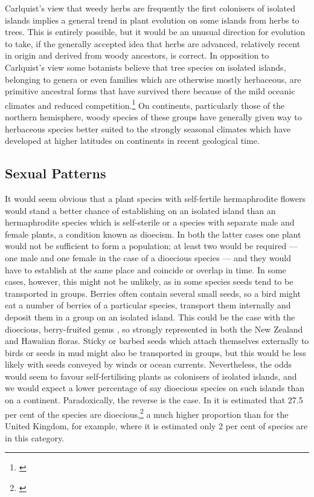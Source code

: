 Carlquist's view that weedy herbs are frequently the first colonisers of isolated islands implies a general trend in plant evolution on some islands from herbs to trees.
This is entirely possible, but it would be an unusual direction for evolution to take, if the generally accepted idea that herbs are advanced, relatively recent in origin and derived from woody ancestors, is correct.
In opposition to Carlquist's view some botanists believe that tree species on isolated islands, belonging to genera or even families which are otherwise mostly herbaceous, are primitive ancestral forms that have survived there because of the mild oceanic climates and reduced competition.\footnote{\cite{mabberley1979pachycaul}}
On continents, particularly those of the northern hemisphere, woody species of these groups have generally given way to herbaceous species better suited to the strongly seasonal climates which have developed at higher latitudes on continents in recent geological time.

\subsection{Sexual Patterns}

It would seem obvious that a plant species with self-fertile hermaphrodite flowers would stand a better chance of establishing on an isolated island than an hermaphrodite species which is self-sterile or a species with separate male and female plants, a condition known as dioecism.
In both the latter cases one plant would not be sufficient to form a population; at least two would be required --- one male and one female in the case of a dioecious species --- and they would have to establish at the same place and coincide or overlap in time.
In some cases, however, this might not be unlikely, as in some species seeds tend to be transported in groups.
Berries often contain several small seeds, so a bird might eat a number of berries of a particular species, transport them internally and deposit them in a group on an isolated island.
This could be the case with the dioecious, berry-fruited genus , so strongly represented in both the New Zealand and Hawaiian floras.
Sticky or barbed seeds which attach themselves externally to birds or seeds in mud might also be transported in groups, but this would be less likely with seeds conveyed by winds or ocean currents.
Nevertheless, the odds would seem to favour self-fertilising plants as colonisers of isolated islands, and we would expect a lower percentage of say dioecious species on such islands than on a continent.
Paradoxically, the reverse is the case.
In  it is estimated that 27.5 per cent of the species are dioecious,\footnote{\cite{carlquist1970hawaii}} a much higher proportion than for the United Kingdom, for example, where it is estimated only 2 per cent of species are in this category.


